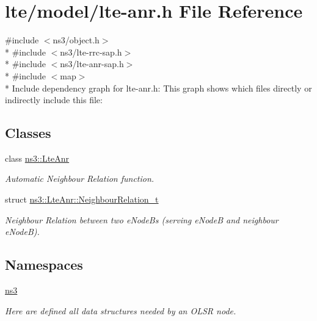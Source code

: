\hypertarget{lte-anr_8h}{}\section{lte/model/lte-\/anr.h File Reference}
\label{lte-anr_8h}
{\ttfamily \#include $<$ns3/object.\+h$>$}\\*
{\ttfamily \#include $<$ns3/lte-\/rrc-\/sap.\+h$>$}\\*
{\ttfamily \#include $<$ns3/lte-\/anr-\/sap.\+h$>$}\\*
{\ttfamily \#include $<$map$>$}\\*
Include dependency graph for lte-\/anr.h\+:
This graph shows which files directly or indirectly include this file\+:
\subsection*{Classes}
\begin{DoxyCompactItemize}
\item 
class \hyperlink{classns3_1_1LteAnr}{ns3\+::\+Lte\+Anr}
\begin{DoxyCompactList}\small\item\em Automatic Neighbour Relation function. \end{DoxyCompactList}\item 
struct \hyperlink{structns3_1_1LteAnr_1_1NeighbourRelation__t}{ns3\+::\+Lte\+Anr\+::\+Neighbour\+Relation\+\_\+t}
\begin{DoxyCompactList}\small\item\em Neighbour Relation between two e\+Node\+Bs (serving e\+NodeB and neighbour e\+NodeB). \end{DoxyCompactList}\end{DoxyCompactItemize}
\subsection*{Namespaces}
\begin{DoxyCompactItemize}
\item 
 \hyperlink{namespacens3}{ns3}
\begin{DoxyCompactList}\small\item\em Here are defined all data structures needed by an O\+L\+SR node. \end{DoxyCompactList}\end{DoxyCompactItemize}
